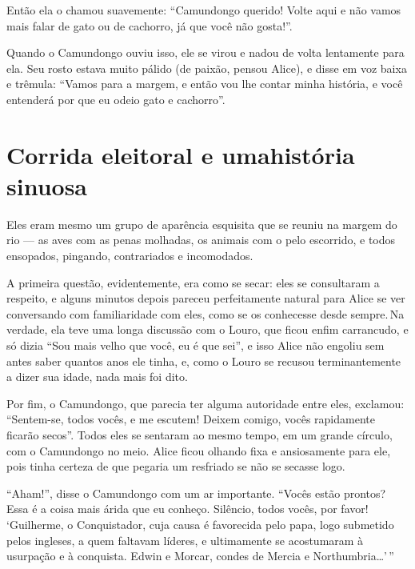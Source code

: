 Então ela o chamou suavemente: ``Camundongo querido! Volte aqui e não
vamos mais falar de gato ou de cachorro, já que você não gosta!''.

Quando o Camundongo ouviu isso, ele se virou e nadou de volta lentamente
para ela. Seu rosto estava muito pálido (de paixão, pensou Alice), e
disse em voz baixa e trêmula: ``Vamos para a margem, e então vou lhe
contar minha história, e você entenderá por que eu odeio gato e
cachorro''.


\quebra\chapter[Corrida eleitoral e uma história sinuosa]{Corrida eleitoral e uma\break história sinuosa}

Eles eram mesmo um grupo de aparência esquisita que se reuniu na margem
do rio --- as aves com as penas molhadas, os animais com o pelo
escorrido, e todos ensopados, pingando, contrariados e incomodados.

A primeira questão, evidentemente, era como se secar: eles se
consultaram a respeito, e alguns minutos depois pareceu perfeitamente
natural para Alice se ver conversando com familiaridade com eles, como
se os conhecesse desde sempre.\,Na verdade, ela teve uma longa discussão
com o Louro, que ficou enfim carrancudo, e só dizia ``Sou mais velho
que você, eu é que sei'', e isso Alice não engoliu sem antes saber
quantos anos ele tinha, e, como o Louro se recusou terminantemente a
dizer sua idade, nada mais foi dito.

Por fim, o Camundongo, que parecia ter alguma autoridade entre eles,
exclamou: ``Sentem-se, todos vocês, e me escutem! Deixem comigo, vocês
rapidamente ficarão secos''. Todos eles se sentaram ao mesmo tempo, em
um grande círculo, com o Camundongo no meio. Alice ficou olhando fixa e
ansiosamente para ele, pois tinha certeza de que pegaria um resfriado se
não se secasse logo. \label{ref4}

``Aham!'', disse o Camundongo com um ar importante. ``Vocês estão
prontos? Essa é a coisa mais árida que eu conheço. Silêncio, todos
vocês, por favor! `Guilherme, o Conquistador, cuja causa é favorecida
pelo papa, logo submetido pelos ingleses, a quem faltavam líderes, e
ultimamente se acostumaram à usurpação e à conquista. Edwin e Morcar,
condes de Mercia e Northumbria\ldots{}'\,''

